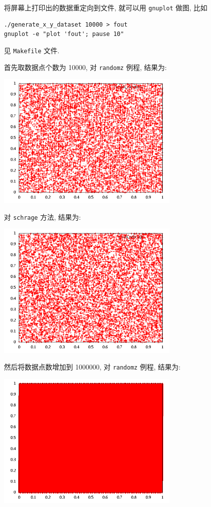\documentclass{ctexart}
\begin{document}
将屏幕上打印出的数据重定向到文件, 就可以用 \verb|gnuplot| 做图, 比如
\begin{verbatim}
./generate_x_y_dataset 10000 > fout
gnuplot -e "plot 'fout'; pause 10"
\end{verbatim}
见 \verb|Makefile| 文件.

首先取数据点个数为 10000, 对 \verb|randomz| 例程, 结果为:
\begin{center}
\includegraphics[width=3.5in]{../randomz_1e4.png}\\
\end{center}
对 \verb|schrage| 方法, 结果为:
\begin{center}
\includegraphics[width=3.5in]{../schrage_1e4.png}\\
\end{center}
然后将数据点数增加到 1000000, 对 \verb|randomz| 例程, 结果为:
\begin{center}
\includegraphics[width=3.5in]{../randomz_1e6.png}\\
\end{center}
\end{document}

